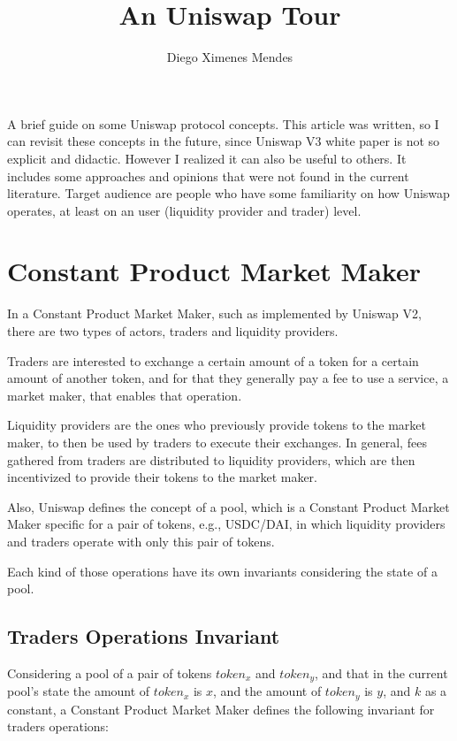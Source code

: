 \documentclass{article}
\title{An Uniswap Tour}
\author{Diego Ximenes Mendes}
\begin{document}
\date{}
\maketitle

A brief guide on some Uniswap protocol concepts.
This article was written, so I can revisit these concepts in the future, since Uniswap V3 white paper is not so explicit and didactic.
However I realized it can also be useful to others.
It includes some approaches and opinions that were not found in the current literature.
Target audience are people who have some familiarity on how Uniswap operates, at least on an user (liquidity provider and trader) level.

\section{Constant Product Market Maker}

In a Constant Product Market Maker, such as implemented by Uniswap V2, there are two types of actors, traders and liquidity providers.

Traders are interested to exchange a certain amount of a token for a certain amount of another token, and for that they generally pay a fee to use a service, a market maker, that enables that operation.

Liquidity providers are the ones who previously provide tokens to the market maker, to then be used by traders to execute their exchanges.
In general, fees gathered from traders are distributed to liquidity providers, which are then incentivized to provide their tokens to the market maker.

Also, Uniswap defines the concept of a pool, which is a Constant Product Market Maker specific for a pair of tokens, e.g., USDC/DAI, in which liquidity providers and traders operate with only this pair of tokens.

Each kind of those operations have its own invariants considering the state of a pool.

\subsection{Traders Operations Invariant}
\label{section:traders_invariant}

Considering a pool of a pair of tokens $token_x$ and $token_y$, and that in the current pool's state the amount of $token_x$ is $x$, and the amount of $token_y$ is $y$, and $k$ as a constant, a Constant Product Market Maker defines the following invariant for traders operations:
\end{document}

